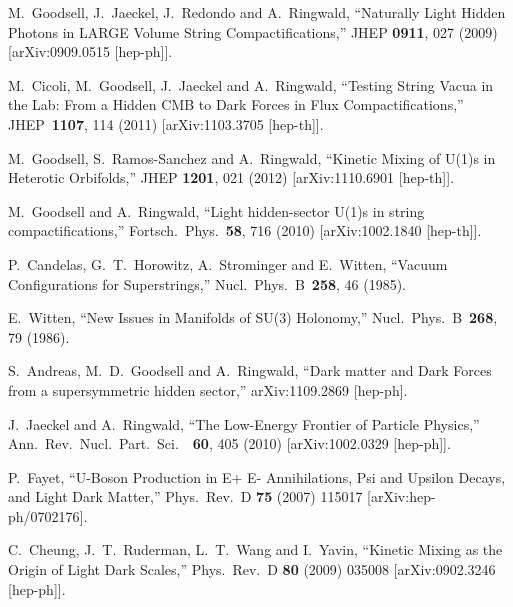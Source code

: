 M.~Goodsell, J.~Jaeckel, J.~Redondo and A.~Ringwald,
 ``Naturally Light Hidden Photons in LARGE Volume String Compactifications,''
 JHEP {\bf 0911}, 027 (2009)
 [arXiv:0909.0515 [hep-ph]].
 
 
  M.~Cicoli, M.~Goodsell, J.~Jaeckel and A.~Ringwald,
  ``Testing String Vacua in the Lab: From a Hidden CMB to Dark Forces in Flux Compactifications,''
  JHEP\ {\bf 1107}, 114  (2011)
  [arXiv:1103.3705 [hep-th]].

 M.~Goodsell, S.~Ramos-Sanchez and A.~Ringwald,
 ``Kinetic Mixing of U(1)s in Heterotic Orbifolds,''
 JHEP {\bf 1201}, 021 (2012)
 [arXiv:1110.6901 [hep-th]].

  M.~Goodsell and A.~Ringwald,
  ``Light hidden-sector U(1)s in string compactifications,''
  Fortsch.\ Phys.\  {\bf 58}, 716 (2010)
  [arXiv:1002.1840 [hep-th]].
 
  P.~Candelas, G.~T.~Horowitz, A.~Strominger and E.~Witten,
  ``Vacuum Configurations for Superstrings,''
  Nucl.\ Phys.\ B\ {\bf 258}, 46  (1985).

  E.~Witten,
  ``New Issues in Manifolds of SU(3) Holonomy,''
  Nucl.\ Phys.\ B\ {\bf 268}, 79  (1986).

 S.~Andreas, M.~D.~Goodsell and A.~Ringwald,
 ``Dark matter and Dark Forces from a supersymmetric hidden sector,''
 arXiv:1109.2869 [hep-ph].

  J.~Jaeckel and A.~Ringwald,
  ``The Low-Energy Frontier of Particle Physics,''
  Ann.\ Rev.\ Nucl.\ Part.\ Sci.\ \ {\bf 60}, 405  (2010)
  [arXiv:1002.0329 [hep-ph]].

P.~Fayet,
``U-Boson Production in E+ E- Annihilations, Psi and Upsilon Decays, and Light Dark Matter,''
Phys.\ Rev.\ D {\bf 75} (2007) 115017
[arXiv:hep-ph/0702176].

C.~Cheung, J.~T.~Ruderman, L.~T.~Wang and I.~Yavin,
``Kinetic Mixing as the Origin of Light Dark Scales,''
Phys.\ Rev.\ D {\bf 80} (2009) 035008
[arXiv:0902.3246 [hep-ph]].

